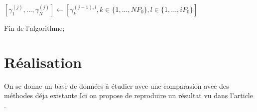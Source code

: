\documentclass[french,12pt]{article}
\begin{document}
\begin{algorithm}
{    $[\gamma_1^{(j)},..., \gamma_N^{(j)}] \gets [\gamma_k^{(j-1), l}, k \in \{1, ..., NP_0\}, l \in \{1, ..., iP_0\}]$



    {
        Fin de l'algorithme;
    }

    }




\end{algorithm}










\pagebreak
\section{Réalisation}
On se donne un base de données à étudier avec une comparasion avec des méthodes déja existante \cite{Chiachio2014,Fernndez2022,Uncertainty_Deep}
Ici on propose de reproduire un résultat vu dans l'article \cite{Fernndez2022}.
\end{document}
